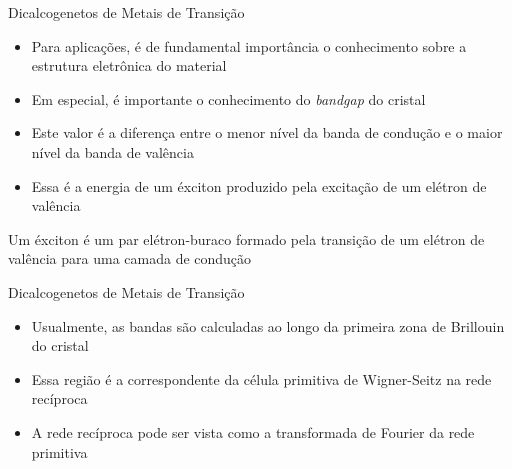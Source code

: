 \begin{frame}{Dicalcogenetos de Metais de Transição}
  \begin{itemize}
    \item Para aplicações, é de fundamental importância o conhecimento sobre a
          estrutura eletrônica do material
    \item Em especial, é importante o conhecimento do \textit{bandgap} do cristal
    \item Este valor é a diferença entre o menor nível da banda de condução e o
          maior nível da banda de valência
    \item Essa é a energia de um éxciton produzido pela excitação de um elétron de valência
  \end{itemize}
  \begin{block}{}
    \centering
    Um éxciton é um par elétron-buraco formado pela transição de um elétron de
    valência para uma camada de condução
  \end{block}
\end{frame}

\begin{frame}{Dicalcogenetos de Metais de Transição}
  \begin{itemize}
    \item Usualmente, as bandas são calculadas ao longo da primeira zona de
          Brillouin do cristal
    \item Essa região é a correspondente da  célula primitiva de Wigner-Seitz na rede
          recíproca
    \item A rede recíproca pode ser vista como a transformada de Fourier da rede
          primitiva
  \end{itemize}
\end{frame}

